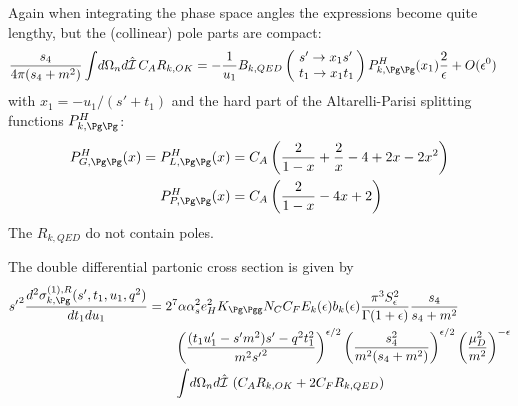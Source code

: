 Again when integrating the phase space angles the expressions become quite lengthy, but the (collinear) pole parts are compact:
\begin{align}
\frac{s_4}{4\pi(s_4+m^2)}\int\!d\Omega_n d\hat{\mathcal I}\,C_A R_{k,OK} &=-\frac 1 {u_1}B_{k,QED}\left(\!\begin{array}{l}s'\rightarrow x_1s'\\t_1\rightarrow x_1 t_1\end{array}\!\!\right) P^H_{k,\Pg\Pg}(x_1)\frac 2 \epsilon + O(\epsilon^0) \label{eq:ROKPoles}
\end{align}
with $x_1 = -u_1/(s'+t_1)$ and the hard part of the Altarelli-Parisi splitting functions $P^H_{k,\Pg\Pg}$\cite{Altarelli:1977zs,Vogelsang:1995vh}:
\begin{align}
P^H_{G,\Pg\Pg}(x) = P^H_{L,\Pg\Pg}(x) &= C_A\left(\frac 2 {1-x} + \frac 2 x - 4 + 2x - 2x^2\right)\\
P^H_{P,\Pg\Pg}(x) &= C_A\left(\frac 2 {1-x} - 4x + 2\right)
\end{align}
The $R_{k,QED}$ do not contain poles. 

The double differential partonic cross section is given by
\begin{align}
{s'}^2\frac{d^2\sigma_{k,\Pg}^{(1),R}(s',t_1,u_1,q^2)}{dt_1du_1} &= 2^7\alpha\alpha_s^2 e_H^2 K_{\Pg\Pgg}N_CC_F E_k(\epsilon) b_k(\epsilon)\frac{\pi^3 S_\epsilon^2}{\Gamma(1+\epsilon)} \frac{s_4}{s_4+m^2}  \nonumber\\
 &\hspace{20pt} \left(\frac{(t_1u_1'-s'm^2)s' - q^2t_1^2}{m^2{s'}^2}\right)^{\epsilon/2} \left(\frac{s_4^2}{m^2(s_4+m^2)}\right)^{\epsilon/2} \left(\frac{\mu_D^2}{m^2}\right)^{-\epsilon} \nonumber\\
 &\hspace{20pt} \int\!d\Omega_n d\hat{\mathcal I}\,\left(C_A R_{k,OK} + 2C_F R_{k,QED}\right)
\end{align}

